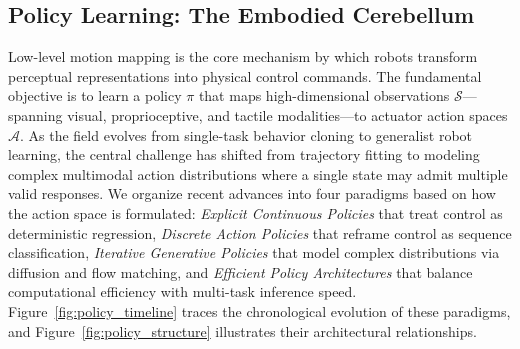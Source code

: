 \documentclass[acmsmall,screen,review,anonymous]{acmart}
\begin{document}
\subsection{Policy Learning: The Embodied Cerebellum}\label{sec:policy_learning_low_level}

Low-level motion mapping is the core mechanism by which robots transform perceptual representations into physical control commands. The fundamental objective is to learn a policy $\pi$ that maps high-dimensional observations $\mathcal{S}$---spanning visual, proprioceptive, and tactile modalities---to actuator action spaces $\mathcal{A}$. As the field evolves from single-task behavior cloning to generalist robot learning, the central challenge has shifted from trajectory fitting to modeling complex multimodal action distributions where a single state may admit multiple valid responses. We organize recent advances into four paradigms based on how the action space is formulated: \emph{Explicit Continuous Policies} that treat control as deterministic regression, \emph{Discrete Action Policies} that reframe control as sequence classification, \emph{Iterative Generative Policies} that model complex distributions via diffusion and flow matching, and \emph{Efficient Policy Architectures} that balance computational efficiency with multi-task inference speed. Figure~\ref{fig:policy_timeline} traces the chronological evolution of these paradigms, and Figure~\ref{fig:policy_structure} illustrates their architectural relationships.
\end{document}
